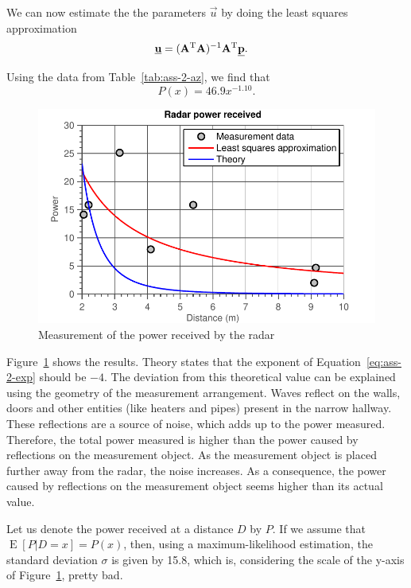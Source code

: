 \documentclass[11pt,titlepage]{report}
\begin{document}
We can now estimate the the parameters $\vec{u}$ by doing the least squares approximation
\begin{align}
	\mathbf{\underline{u}} &= (\mathbf{A}^{\text T} \mathbf{A})^{-1} \mathbf{A}^{\text T} \mathbf{\underline{p}}.
\end{align}

Using the data from Table~\ref{tab:ass-2-az}, we find that
\begin{equation} \label{eq:ass-2-exp}
	P(x) = 46.9 x^{-1.10}.
\end{equation}

\begin{figure}[H]
	\begin{center}
		\includegraphics[width=.8\linewidth]{resource/fit.pdf}
	\end{center}
	\caption{Measurement of the power received by the radar}
	\label{fig:ass-2-power}
\end{figure}

Figure~\ref{fig:ass-2-power} shows the results. Theory states that the exponent of Equation~\ref{eq:ass-2-exp} should be $-4$. The deviation from this theoretical value can be explained using the geometry of the measurement arrangement. Waves reflect on the walls, doors and other entities (like heaters and pipes) present in the narrow hallway. These reflections are a source of noise, which adds up to the power measured. Therefore, the total power measured is higher than the power caused by reflections on the measurement object. As the measurement object is placed further away from the radar, the noise increases. As a consequence, the power caused by reflections on the measurement object seems higher than its actual value.

Let us denote the power received at a distance $D$ by $P$. If we assume that $\operatorname{E}[P|D=x]=P(x)$, then, using a maximum-likelihood estimation, the standard deviation $\sigma$ is given by \num{15.8}, which is, considering the scale of the y-axis of Figure~\ref{fig:ass-2-power}, pretty bad.
\end{document}
